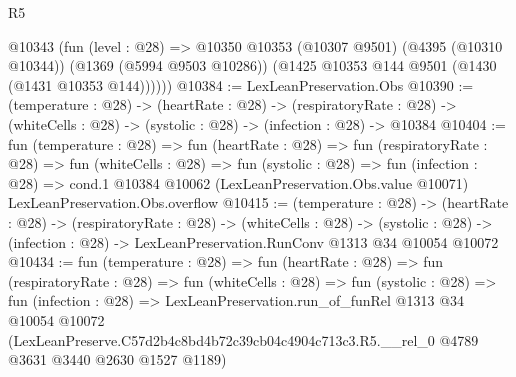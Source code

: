 \begin{lexlean}{R5}
\begin{coremodule}
      @10343
        (fun (level : @28) =>
        @10350
          @10353
          (@10307 @9501)
          (@4395 (@10310 @10344))
          (@1369 (@5994 @9503 @10286))
          (@1425 @10353 @144 @9501 (@1430 (@1431 @10353 @144))))))
@10384 := LexLeanPreservation.Obs
@10390 := (temperature : @28) ->
  (heartRate : @28) ->
  (respiratoryRate : @28) -> (whiteCells : @28) -> (systolic : @28) -> (infection : @28) -> @10384
@10404 := fun (temperature : @28) =>
  fun (heartRate : @28) =>
  fun (respiratoryRate : @28) =>
  fun (whiteCells : @28) =>
  fun (systolic : @28) =>
  fun (infection : @28) =>
  cond.{1} @10384 @10062 (LexLeanPreservation.Obs.value @10071) LexLeanPreservation.Obs.overflow
@10415 := (temperature : @28) ->
  (heartRate : @28) ->
  (respiratoryRate : @28) ->
  (whiteCells : @28) ->
  (systolic : @28) -> (infection : @28) -> LexLeanPreservation.RunConv @1313 @34 @10054 @10072
@10434 := fun (temperature : @28) =>
  fun (heartRate : @28) =>
  fun (respiratoryRate : @28) =>
  fun (whiteCells : @28) =>
  fun (systolic : @28) =>
  fun (infection : @28) =>
  LexLeanPreservation.run_of_funRel
    @1313
    @34
    @10054
    @10072
    (LexLeanPreserve.C57d2b4c8bd4b72c39cb04c4904c713c3.R5.__rel_0
      @4789
      @3631
      @3440
      @2630
      @1527
      @1189)
\end{coremodule}
\end{lexlean}
